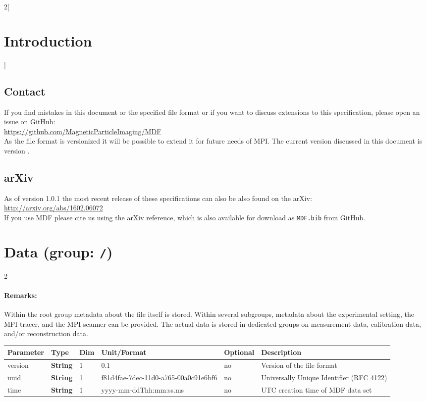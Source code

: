 \documentclass[landscape,a4paper]{article} %
\newcommand{\inl}[1]{\lstinline[columns=fixed]{#1}}
\newcommand{\inltab}[1]{{\ttfamily\bfseries\color{blue}#1}}
\newcommand{\inlvar}[1]{{\ttfamily#1}}
\begin{document}
\begin{multicols}{2}[\section{Introduction} \label{Sec:Introduction}]
\subsection{Contact}

If you find mistakes in this document or the specified file format or if you want to discuss extensions to this specification, please open an issue on GitHub:\\
\hspace*{1cm}\url{https://github.com/MagneticParticleImaging/MDF}\\
As the file format is versionized it will be possible to extend it for future needs of MPI. The current version discussed in this document is version \version.

\subsection{arXiv}
As of version 1.0.1 the most recent release of these specifications can also be also found on the arXiv:\\
\hspace*{1cm}\url{http://arxiv.org/abs/1602.06072}\\
If you use MDF please cite us using the arXiv reference, which is also available for download as \texttt{MDF.bib} from GitHub.

\end{multicols}

\section{Data (group: \inl{/})}
 \setlength\extrarowheight{5pt}

\begin{multicols}{2}
\paragraph{Remarks:} Within the root group metadata about the file itself is stored. Within several subgroups, metadata about the experimental setting, the MPI tracer, and the MPI scanner can be provided. The actual data is stored in dedicated groups on measurement data, calibration data, and/or reconstruction data.
\end{multicols}

\noindent \begin{tabularx}{\columnwidth}{lllllX} 
\textbf{Parameter} & \textbf{Type} & \textbf{Dim} & \textbf{Unit/Format} & \textbf{Optional} & \textbf{Description} \\ \hline 
\inlvar{version} & \inltab{String} & 1 & 0.1 & no & Version of the file format \\ \hline
\inlvar{uuid} & \inltab{String} & 1 & f81d4fae-7dec-11d0-a765-00a0c91e6bf6 & no & Universally Unique Identifier (RFC 4122) \\ \hline 
\inlvar{time} & \inltab{String} & 1 & yyyy-mm-ddThh:mm:ss.ms & no & UTC creation time of MDF data set \\ \hline
\end{tabularx}
\end{document}
